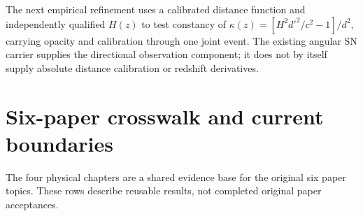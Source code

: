 \documentclass[
  10pt,
]{article}
\begin{document}
The next empirical refinement uses a calibrated distance function and
independently qualified \(H(z)\) to test constancy of
\(\kappa(z)=[H^2d'^2/c^2-1]/d^2\), carrying opacity and calibration
through one joint event. The existing angular SN carrier supplies the
directional observation component; it does not by itself supply absolute
distance calibration or redshift derivatives.

\hypertarget{six-paper-crosswalk-and-current-boundaries}{%
\section{Six-paper crosswalk and current
boundaries}\label{six-paper-crosswalk-and-current-boundaries}}

The four physical chapters are a shared evidence base for the original
six paper topics. These rows describe reusable results, not completed
original paper acceptances.
\end{document}
